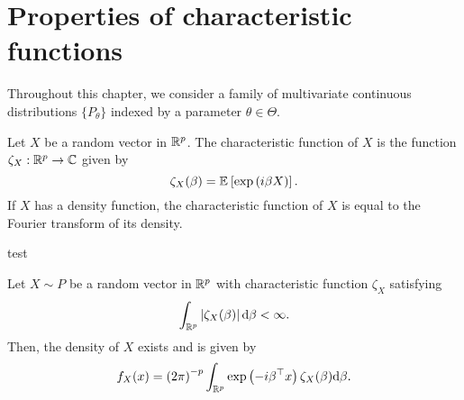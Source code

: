 \section{Properties of characteristic functions}

Throughout this chapter, we consider a family of multivariate continuous distributions $\{ P_\theta \}$ indexed by a parameter $\theta \in \Theta$.


\begin{definition}
    Let $X$ be a random vector in $\mathbb{R}^p$. The characteristic function of $X$ is the function $\zeta_X : \mathbb{R}^p \rightarrow \mathbb{C}$ given by
    \begin{equation*}
        \zeta_X(\beta) = \mathbb{E}_{}\left[\exp\left(i\beta X\right)\right].
    \end{equation*}
    If $X$ has a density function, the characteristic function of $X$ is equal to the Fourier transform of its density.
\end{definition}

\begin{example}
    test
\end{example}

\begin{theorem}
    Let $X \sim P$ be a random vector in $\mathbb{R}^p$ with characteristic function $\zeta_X$ satisfying
    \begin{equation} \label{eq-charfun_abs_int}
        \int_{\mathbb{R}^p} \left|\zeta_X(\beta)\right| \text{d} \beta < \infty.
    \end{equation}
    Then, the density of $X$ exists and is given by
    \begin{equation} \label{eq-density-via-charfun}
        f_X(x) = \left(2\pi\right)^{-p} \int_{\mathbb{R}^p}  \exp\left(-i\beta^\top x\right)\zeta_X(\beta)  \text{d} \beta.
    \end{equation}
\end{theorem}

